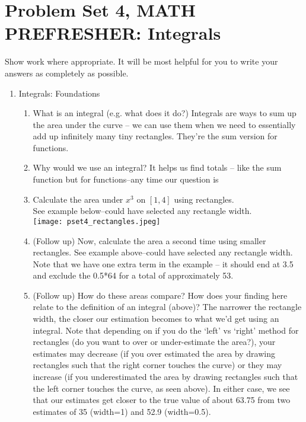 \documentclass[11pt]{article}
\begin{document}
\section*{Problem Set 4, MATH PREFRESHER: Integrals }
Show work where appropriate. It will be most helpful for you to write your answers as completely as possible. 

\begin{enumerate}
\item Integrals: Foundations
\begin{enumerate}

\item What is an integral (e.g. what does it do?) {\color{gray}Integrals are ways to sum up the area under the curve --  we can use them when we need to essentially add up infinitely many tiny rectangles. They're the sum version for functions.}
\item Why would we use an integral? {\color{gray} It helps us find totals -- like the sum function but for functions--any time our question is }
\item Calculate the area under $x^3$ on $[1,4]$ using rectangles. \\ {\color{gray} See example below--could have selected any rectangle width. }\\
\texttt{[image: pset4\_rectangles.jpeg]}
\item (Follow up) Now, calculate the area a second time using smaller rectangles. {\color{gray} See example above--could have selected any rectangle width. Note that we have one extra term in the example -- it should end at 3.5 and exclude the 0.5*64 for a total of approximately 53.  }
\item (Follow up) How do these areas compare? How does your finding here relate to the definition of an integral (above)?{\color{gray} The narrower the rectangle width, the closer our estimation becomes to what we'd get using an integral. Note that depending on if you do the `left' vs `right' method for rectangles (do you want to over or under-estimate the area?), your estimates may decrease (if you over estimated the area by drawing rectangles such that the right corner touches the curve) or they may increase (if you underestimated the area by drawing rectangles such that the left corner touches the curve, as seen above). In either case, we see that our estimates get closer to the true value of about 63.75 from two estimates of 35 (width=1) and 52.9 (width=0.5).}
\end{enumerate}



\end{enumerate}
\end{document}
